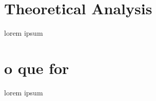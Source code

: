 \section{Theoretical Analysis}
\label{sec:analysis}

lorem ipsum


\section{o que for}

lorem ipsum
